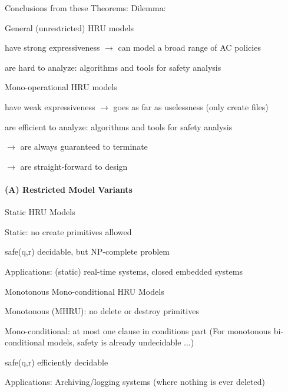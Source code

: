 \documentclass[a4paper]{article}
\begin{document}
\begin{multicols}{3}
    Conclusions from these Theorems: Dilemma:
    \begin{itemize*}
        \item General (unrestricted) HRU models
        \begin{itemize*}
            \item have strong expressiveness $\rightarrow$  can model a broad range of AC policies
            \item are hard to analyze: algorithms and tools for safety analysis
        \end{itemize*}
        \item Mono-operational HRU models
        \begin{itemize*}
            \item have weak expressiveness $\rightarrow$ goes as far as uselessness (only create files)
            \item are efficient to analyze: algorithms and tools for safety analysis
            \item $\rightarrow$ are always guaranteed to terminate
            \item $\rightarrow$ are straight-forward to design
        \end{itemize*}
    \end{itemize*}

    \paragraph{(A) Restricted Model Variants}
    Static HRU Models
    \begin{itemize*}
        \item Static: no create primitives allowed
        \item safe(q,r) decidable, but NP-complete problem
        \item Applications: (static) real-time systems, closed embedded systems
    \end{itemize*}

    Monotonous Mono-conditional HRU Models
    \begin{itemize*}
        \item Monotonous (MHRU): no delete or destroy primitives
        \item Mono-conditional: at most one clause in conditions part (For monotonous bi-conditional models, safety is already undecidable ...)
        \item safe(q,r) efficiently decidable
        \item Applications: Archiving/logging systems (where nothing is ever deleted)
    \end{itemize*}


\end{multicols}
\end{document}
